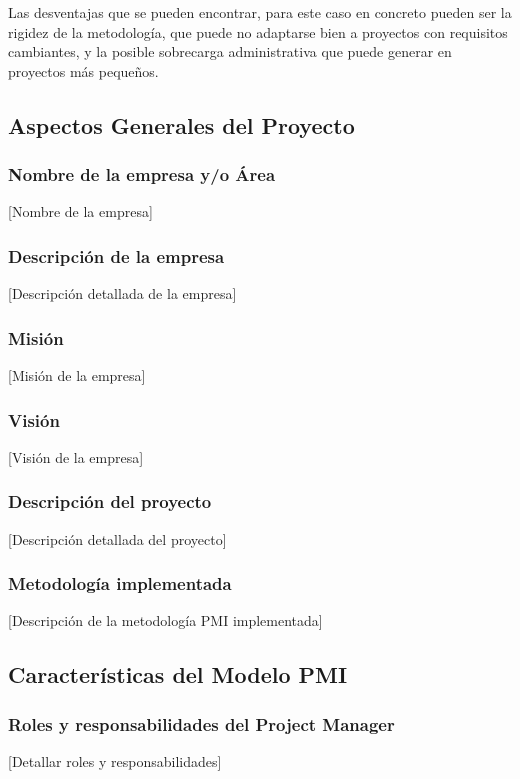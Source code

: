 \documentclass[12pt,a4paper]{article}
\begin{document}
Las desventajas que se pueden encontrar, para este caso en concreto pueden ser la rigidez de la metodología, que puede no adaptarse bien a proyectos con requisitos cambiantes, y la posible sobrecarga administrativa que puede generar en proyectos más pequeños.

\subsection{Aspectos Generales del Proyecto}
\subsubsection{Nombre de la empresa y/o Área}
[Nombre de la empresa]

\subsubsection{Descripción de la empresa}
[Descripción detallada de la empresa]

\subsubsection{Misión}
[Misión de la empresa]

\subsubsection{Visión}
[Visión de la empresa]

\subsubsection{Descripción del proyecto}
[Descripción detallada del proyecto]

\subsubsection{Metodología implementada}
[Descripción de la metodología PMI implementada]

\subsection{Características del Modelo PMI}
\subsubsection{Roles y responsabilidades del Project Manager}
[Detallar roles y responsabilidades]
\end{document}
